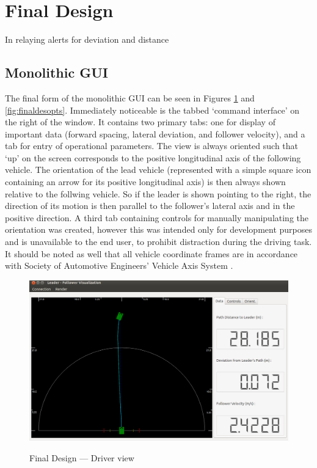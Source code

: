 \documentclass[12pt]{report}
\begin{document}
\section{Final Design} \label{sec:finaldes}
In relaying alerts for deviation and distance

\subsection{Monolithic GUI} \label{sec:finaldes_monolith}
The final form of the monolithic GUI can be seen in Figures \ref{fig:finaldesdriv_monolith} and \ref{fig:finaldesopts}. Immediately noticeable is the tabbed `command interface' on the right of the window. It contains two primary tabs: one for display of important data (forward spacing, lateral deviation, and follower velocity), and a tab for entry of operational parameters. The view is always oriented such that `up' on the screen corresponds to the positive longitudinal axis of the following vehicle. The orientation of the lead vehicle (represented with a simple square icon containing an arrow for its positive longitudinal axis) is then always shown relative to the follwing vehicle. So if the leader is shown pointing to the right, the direction of its motion is then parallel to the follower's lateral axis and in the positive direction. A third tab containing controls for manually manipulating the orientation was created, however this was intended only for development purposes and is unavailable to the end user, to prohibit distraction during the driving task. It should be noted as well that all vehicle coordinate frames are in accordance with Society of Automotive Engineers' Vehicle Axis System \cite{vdbook}.


\begin{figure}[ht] \centering \label{fig:finaldesdriv_monolith}
    \includegraphics[width=6.5in]{./figs/final_design_data.png}
    \caption{Final Design --- Driver view}
\end{figure}
\end{document}
